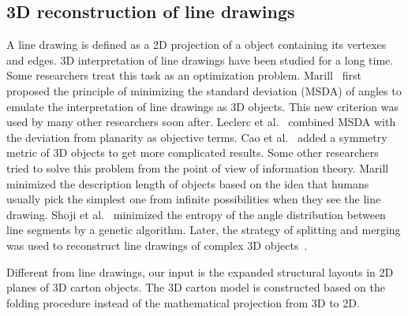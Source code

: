 \subsection{3D reconstruction of line drawings}

A line drawing is defined as a 2D projection of a object containing its vertexes and edges. 3D interpretation of line drawings have been studied for a long time. 
Some researchers treat this task as an optimization problem. 
Marill~\cite{Marill:1991:EHI:113057.113061} first proposed the principle of minimizing the standard deviation (MSDA) of angles to emulate the interpretation of line drawings as 3D objects. 
%
This new criterion was used by many other researchers soon after. 
Leclerc et al.~\cite{Leclerc1992An} combined MSDA with the deviation from planarity as objective terms. 
Cao et al.~\cite{Cao:2005:ORS:1097114.1097658} added a symmetry metric of 3D objects to get more complicated results. 
Some other researchers tried to solve this problem from the point of view of information theory.
%
Marill~\cite{Marill1992Why} minimized the description length of objects based on the idea that humans usually pick the simplest one from infinite possibilities when they see the line drawing. 
Shoji et al.~\cite{Shoji20013} minimized the entropy of the angle distribution between line segments by a genetic algorithm. 
Later, the strategy of splitting and merging was used to reconstruct line drawings of complex 3D objects~\cite{10.1109/TPAMI.2010.49,10.1109/CVPR.2014.94}.   
		 
Different from line drawings, our input is the expanded structural layouts in 2D planes of 3D carton objects.
The 3D carton model is constructed based on the folding procedure instead of the mathematical projection from 3D to 2D.

